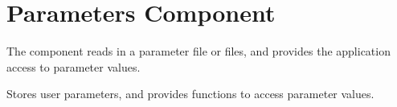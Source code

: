 \section{Parameters Component} \label{s:component-parameters}

The  component reads in a parameter file or files, and
provides the application access to parameter values.

        Stores user parameters, and provides functions to access
        parameter values.

